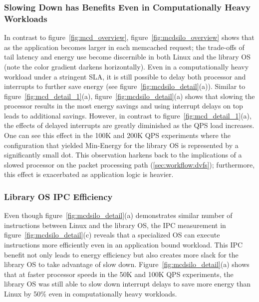\subsubsection{Slowing Down has Benefits Even in Computationally Heavy Workloads}
\label{sec:mcdsilo:dvfstradeoff}
In contrast to figure~\ref{fig:mcd_overview}, figure~\ref{fig:mcdsilo_overview} shows that as the application becomes larger in each memcached request; the trade-offs of tail latency and energy use become discernible in both Linux and the library OS (note the color gradient darkens horizontally).
Even in a computationally heavy workload under a stringent SLA, it is still possible to delay both processor and interrupts to further save energy (see figure~\ref{fig:mcdsilo_detail}(a)). Similar to figure~\ref{fig:mcd_detail_1}(a), figure~\ref{fig:mcdsilo_detail}(a) shows that slowing the processor results in the most energy savings and using interrupt delays on top leads to additional savings. However, in contrast to figure~\ref{fig:mcd_detail_1}(a), the effects of delayed interrupts are greatly diminished as the QPS load increases.
One can see this effect in the 100K and 200K QPS experiments where the configuration that yielded Min-Energy for the library OS is represented by a significantly small dot. This observation harkens back to the implications of a slowed processor on the packet processing path (\cref{sec:workflow:dvfs}); furthermore, this effect is exacerbated as application logic is heavier.

\subsubsection{Library OS IPC Efficiency}
\label{sec:mcdsilo:ipc}
Even though figure~\ref{fig:mcdsilo_detail}(a) demonstrates similar number of instructions between Linux and the library OS, the IPC measurement in figure~\ref{fig:mcdsilo_detail}(c) reveals that a specialized OS can execute instructions more efficiently even in an application bound workload. This IPC benefit not only leads to energy efficiency but also creates more slack for the library OS to take advantage of slow down. Figure~\ref{fig:mcdsilo_detail}(a) shows that at faster processor speeds in the 50K and 100K QPS experiments, the library OS was still able to slow down interrupt delays to save more energy than Linux by 50\% even in computationally heavy workloads.



